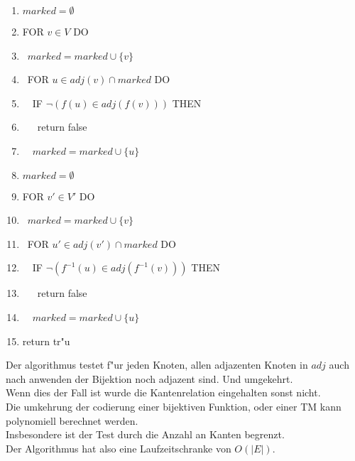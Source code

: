 \documentclass{article}
\newcommand{\tab}{\null\ \qquad}
\begin{document}
\begin{enumerate}
    \item $marked = \emptyset$
    \item FOR $v \in V$ DO
    \item \tab $marked = marked \cup \{v\}$
    \item \tab FOR $u \in adj(v) \cap marked$ DO
    \item \tab \tab IF $\neg ( f(u) \in adj(f(v)) )$ THEN
    \item \tab \tab \tab return false
    \item \tab \tab $marked = marked \cup \{u\}$
    \item $marked = \emptyset$
    \item FOR $v' \in V'$ DO
    \item \tab $marked = marked \cup \{v\}$
    \item \tab FOR $u' \in adj(v') \cap marked$ DO
    \item \tab \tab IF $\neg ( f^{-1}(u) \in adj(f^{-1}(v)) )$ THEN
    \item \tab \tab \tab return false
    \item \tab \tab $marked = marked \cup \{u\}$
    \item return tr"u
\end{enumerate}
Der algorithmus testet f"ur jeden Knoten, allen adjazenten Knoten in $adj$ 
    auch nach anwenden der Bijektion noch adjazent sind. Und umgekehrt.\\
Wenn dies der Fall ist wurde die Kantenrelation eingehalten sonst nicht.\\
Die umkehrung der codierung einer bijektiven Funktion, oder einer TM 
    kann polynomiell berechnet werden.\\
Insbesondere ist der Test durch die Anzahl an Kanten begrenzt.\\
Der Algorithmus hat also eine Laufzeitschranke von $O(|E|)$.\\

\end{document}
